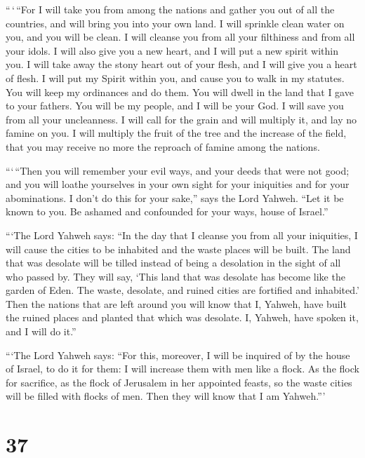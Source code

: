  ``\,`\,``For I will take you from among the nations and
gather you out of all the countries, and will bring you into your own
land.  I will sprinkle clean water on you, and you will be
clean. I will cleanse you from all your filthiness and from all your
idols.  I will also give you a new heart, and I will put a
new spirit within you. I will take away the stony heart out of your
flesh, and I will give you a heart of flesh.  I will put my
Spirit within you, and cause you to walk in my statutes. You will keep
my ordinances and do them.  You will dwell in the land that
I gave to your fathers. You will be my people, and I will be your God.
 I will save you from all your uncleanness. I will call for
the grain and will multiply it, and lay no famine on you. 
I will multiply the fruit of the tree and the increase of the field,
that you may receive no more the reproach of famine among the nations.

 ```\,``Then you will remember your evil ways, and your
deeds that were not good; and you will loathe yourselves in your own
sight for your iniquities and for your abominations.  I
don't do this for your sake,'' says the Lord Yahweh. ``Let it be known
to you. Be ashamed and confounded for your ways, house of Israel.''

 ```The Lord Yahweh says: ``In the day that I cleanse you
from all your iniquities, I will cause the cities to be inhabited and
the waste places will be built.  The land that was desolate
will be tilled instead of being a desolation in the sight of all who
passed by.  They will say, `This land that was desolate has
become like the garden of Eden. The waste, desolate, and ruined cities
are fortified and inhabited.'  Then the nations that are
left around you will know that I, Yahweh, have built the ruined places
and planted that which was desolate. I, Yahweh, have spoken it, and I
will do it.''

 ```The Lord Yahweh says: ``For this, moreover, I will be
inquired of by the house of Israel, to do it for them: I will increase
them with men like a flock.  As the flock for sacrifice, as
the flock of Jerusalem in her appointed feasts, so the waste cities will
be filled with flocks of men. Then they will know that I am Yahweh.'''

\hypertarget{section-35}{%
\section{37}\label{section-35}}

